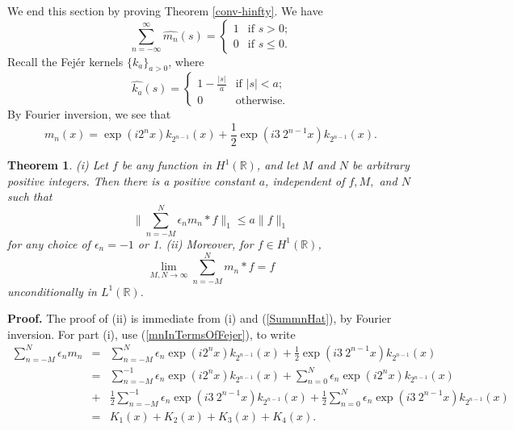 \documentclass[12pt]{article}
\newcommand{\R}{\mathbb R}
\newtheorem{thm}[defin]{Theorem}
\begin{document}
We end this section by proving Theorem \ref{conv-hinfty}.
We have
\begin{equation}
\sum^\infty_{n=-\infty} \widehat{m_n}(s)
=\left\{
\begin{array}{ll}
1 & \mbox{if $s>0$;}\\
0 &  \mbox{if $s\leq 0$.}
\end{array}
\right.
\label{SummnHat}
\end{equation}
Recall the Fej\' er kernels $\{k_a\}_{a>0}$, where
\begin{equation}
\widehat{k_a}(s)
=\left\{
\begin{array}{ll}
1-\frac{|s|}{a} & \mbox{if $|s|<a$;}\\
0 &  \mbox{otherwise.}
\end{array}
\right.
\label{FourierTransformOfFejer}
\end{equation}
By Fourier inversion, we see that
\begin{equation}
m_n(x) =\exp(i 2^n x) k_{2^{n-1}}(x)+
\frac{1}{2}  \exp (i 3\ 2^{n-1} x) k_{2^{n-1}} (x).
\label{mnInTermsOfFejer}
\end{equation}
\begin{thm}
(i)  Let $f$ be any function in $H^1(\R)$, and let 
$M$ and $N$ be arbitrary positive integers.  Then 
there is a 
positive constant $a$, independent of $f, M,$ and $N$ such that
\begin{equation}
     \|\sum_{n=-M}^N\epsilon_n m_n*f\|_1\leq a \|f\|_1
\label{eq1lpth1}
\end{equation}
for any choice of $\epsilon_n=-1$ or 1.  (ii)  Moreover,
for $f\in H^1(\R)$,
$$\lim_{M,N\rightarrow\infty} \sum^N_{n=-M}
m_n*f=f$$
unconditionally in $L^1(\R)$.
\label{UnconditionalConvergenceOnR}
\end{thm}
{\bf Proof.}  
The proof of (ii) is immediate from (i) and (\ref{SummnHat}),
by Fourier inversion.  
For part (i), 
use (\ref{mnInTermsOfFejer}), 
to write 
\begin{eqnarray*}
\sum_{n=-M}^N\epsilon_n m_n		&=&
\sum_{n=-M}^N\epsilon_n\exp(i 2^n x) k_{2^{n-1}}(x)+
\frac{1}{2}  \exp (i 3\ 2^{n-1} x) k_{2^{n-1}} (x)\\
					&=&
\sum_{n=-M}^{-1}\epsilon_n\exp(i 2^n x) k_{2^{n-1}}(x)
+\sum_{n=0}^N\epsilon_n\exp(i 2^n x) k_{2^{n-1}}(x)\\
&+&
\frac{1}{2}
\sum_{n=-M}^{-1} \epsilon_n
  \exp (i 3\ 2^{n-1} x) k_{2^{n-1}} (x) 
+ \frac{1}{2}\sum_{n=0}^N
	\epsilon_n
  \exp (i 3\ 2^{n-1} x) k_{2^{n-1}} (x)\\
					&=&
K_1(x)+K_2 (x)+K_3 (x)+K_4(x).
\end{eqnarray*}
\end{document}
